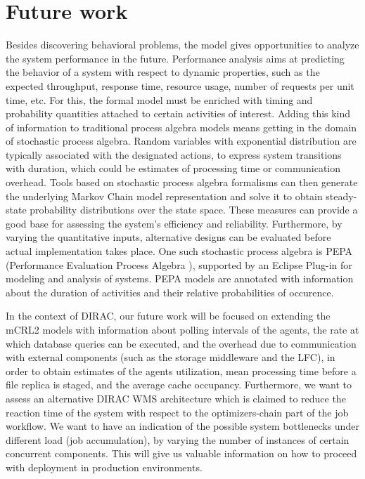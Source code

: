 \documentclass[sort&compress,preprint,3p]{elsarticle}
\begin{document}
\section{Future work}
\label{sec:Section_6}
Besides discovering behavioral problems, the 
model gives opportunities to analyze the system performance in the future.
Performance analysis aims at predicting the behavior of a system with respect to dynamic properties, such as 
the expected throughput, response time, resource usage, number of requests per unit time, etc.
For this, the formal model must be enriched with timing and probability quantities attached 
to certain activities of interest.  Adding this kind of information to traditional process algebra models
means getting in the domain of stochastic process algebra. Random variables with exponential distribution are
typically associated with the designated actions, to express system transitions with duration, which could be estimates
of processing time or communication overhead. Tools based on stochastic process algebra formalisms can
then generate the underlying Markov Chain model representation and solve it to obtain steady-state probability distributions over the state space. These measures can provide a good base for assessing the system's efficiency and reliability. 
Furthermore, by varying the quantitative inputs, alternative designs can be evaluated before actual implementation
takes place. One such stochastic process algebra is PEPA (Performance Evaluation Process Algebra \cite{PEPA}), supported
by an Eclipse Plug-in for modeling and analysis of systems. 
PEPA models are annotated with information about the duration of activities and their relative probabilities of occurence.

In the context of DIRAC, our future work will be focused on extending the mCRL2 models with information about polling intervals of the agents, the rate at which database queries can be executed, and the overhead due to communication with external components (such as the storage middleware and the LFC), in order to obtain estimates of the agents utilization, mean processing time before a file replica is staged, and the average cache occupancy. 
Furthermore, we want to assess an alternative DIRAC WMS architecture which is claimed to reduce the reaction time of the system with respect to the optimizers-chain part of the job workflow. We want to have an indication of the possible system bottlenecks under different load (job accumulation), by varying the number of instances of certain concurrent components. This will give us valuable information on how to proceed with deployment in production environments.
\end{document}
